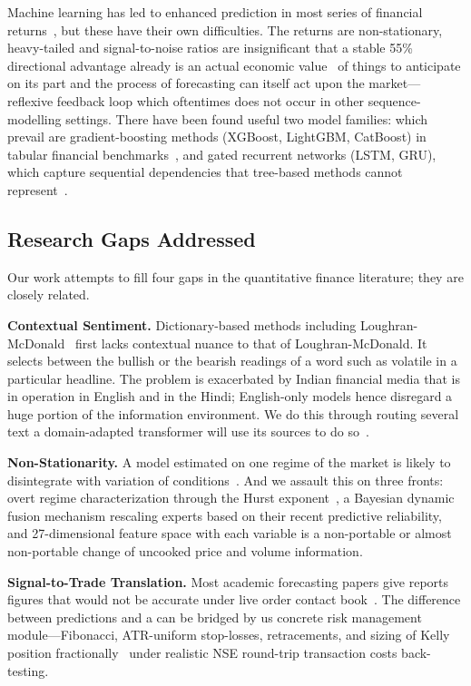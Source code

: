 \documentclass[10pt,a4paper,twoside]{article}
\begin{document}
Machine learning has led to enhanced prediction in most series of financial
returns~\cite{lecun2015}, but these have their own difficulties. The returns
are non-stationary, heavy-tailed and signal-to-noise ratios are insignificant
that a stable 55\% directional advantage already is an actual economic
value~\cite{lopez2018} of things to anticipate on its part and the process of
forecasting can itself act upon the market---reflexive feedback loop which
oftentimes does not occur in other sequence-modelling settings.
There have been found useful two model families: which prevail are
gradient-boosting methods (XGBoost, LightGBM, CatBoost) in tabular financial
benchmarks~\cite{grinsztajn2022}, and gated recurrent networks (LSTM,
GRU), which capture sequential dependencies that tree-based methods cannot
represent~\cite{hochreiter1997,cho2014}.

\subsection{Research Gaps Addressed}

Our work attempts to fill four gaps in the quantitative finance literature; they are
closely related.

\textbf{Contextual Sentiment.} Dictionary-based methods including
Loughran-McDonald~\cite{loughran2011} first lacks contextual nuance to that of
Loughran-McDonald. It selects between the bullish or the bearish readings of a
word such as volatile in a particular headline. The problem is exacerbated by
Indian financial media that is in operation in English and in the Hindi;
English-only models hence disregard a huge portion of the information
environment. We do this through routing several text a domain-adapted
transformer will use its sources to do so~\cite{araci2019}.

\textbf{Non-Stationarity.} A model estimated on one regime of the market is
likely to disintegrate with variation of conditions~\cite{hamilton1989}. And we
assault this on three fronts: overt regime characterization through the Hurst
exponent~\cite{hurst1951}, a Bayesian dynamic fusion mechanism rescaling
experts based on their recent predictive reliability, and 27-dimensional
feature space with each variable is a non-portable or almost non-portable
change of uncooked price and volume information.

\textbf{Signal-to-Trade Translation.} Most academic forecasting papers give
reports figures that would not be accurate under live order contact
book~\cite{lopez2018}. The difference between predictions and a can be bridged
by us concrete risk management module---Fibonacci, ATR-uniform stop-losses,
retracements, and sizing of Kelly position fractionally~\cite{kelly1956} under
realistic NSE round-trip transaction costs back-testing.
\end{document}
